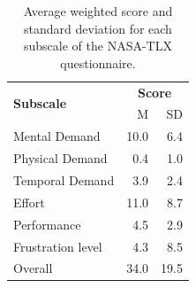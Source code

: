 \begin{table}[t]
    \footnotesize
    \centering
    \begin{tabular}{lrr}
        \toprule
        \multirow{2}{*}{\textbf{Subscale}} & \multicolumn{2}{c}{\textbf{Score}} \\
         & M & SD \\
        \midrule
        Mental Demand & 10.0 & 6.4 \\
        Physical Demand & 0.4 & 1.0 \\
        Temporal Demand & 3.9 & 2.4 \\
        Effort & 11.0 & 8.7 \\
        Performance & 4.5 & 2.9 \\
        Frustration level & 4.3 & 8.5 \\
        \midrule
        Overall & 34.0 & 19.5 \\
        \bottomrule
    \end{tabular}
    \caption{Average weighted score and standard deviation for each subscale of the NASA-TLX questionnaire.}
    \label{tbl:quantumleap:nasa-tlx}
\end{table}

